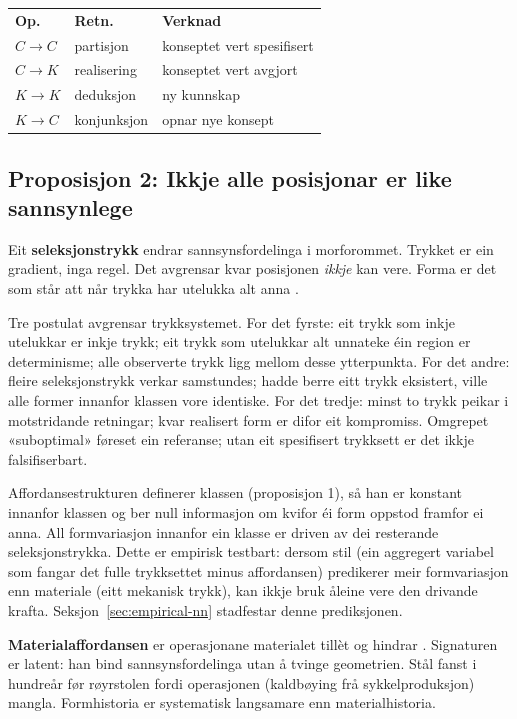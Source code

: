 \begin{center}\small
\begin{tabular}{@{}l@{\;\;}l@{\;\;}l@{}}
\textbf{Op.} & \textbf{Retn.} & \textbf{Verknad} \\[2pt]
$C \!\to\! C$ & partisjon & konseptet vert spesifisert \\
$C \!\to\! K$ & realisering & konseptet vert avgjort \\
$K \!\to\! K$ & deduksjon & ny kunnskap \\
$K \!\to\! C$ & konjunksjon & opnar nye konsept \\
\end{tabular}
\end{center}

\subsection{Proposisjon 2: Ikkje alle posisjonar er like sannsynlege}

Eit \textbf{seleksjonstrykk} endrar sannsynsfordelinga i morforommet. Trykket er ein gradient, inga regel. Det avgrensar kvar posisjonen \textit{ikkje} kan vere. Forma er det som står att når trykka har utelukka alt anna \parencite{Michl1995}.

Tre postulat avgrensar trykksystemet. For det fyrste: eit trykk som inkje utelukkar er inkje trykk; eit trykk som utelukkar alt unnateke éin region er determinisme; alle observerte trykk ligg mellom desse ytterpunkta. For det andre: fleire seleksjonstrykk verkar samstundes; hadde berre eitt trykk eksistert, ville alle former innanfor klassen vore identiske. For det tredje: minst to trykk peikar i motstridande retningar; kvar realisert form er difor eit kompromiss. Omgrepet «suboptimal» føreset ein referanse; utan eit spesifisert trykksett er det ikkje falsifiserbart.

Affordansestrukturen definerer klassen (proposisjon 1), så han er konstant innanfor klassen og ber null informasjon om kvifor éi form oppstod framfor ei anna. All formvariasjon innanfor ein klasse er driven av dei resterande seleksjonstrykka. Dette er empirisk testbart: dersom stil (ein aggregert variabel som fangar det fulle trykksettet minus affordansen) predikerer meir formvariasjon enn materiale (eitt mekanisk trykk), kan ikkje bruk åleine vere den drivande krafta. Seksjon~\ref{sec:empirical-nn} stadfestar denne prediksjonen.

\textbf{Materialaffordansen} er operasjonane materialet tillèt og hindrar \parencite{Gibson1979}. Signaturen er latent: han bind sannsynsfordelinga utan å tvinge geometrien. Stål fanst i hundreår før røyrstolen fordi operasjonen (kaldbøying frå sykkelproduksjon) mangla. Formhistoria er systematisk langsamare enn materialhistoria.

